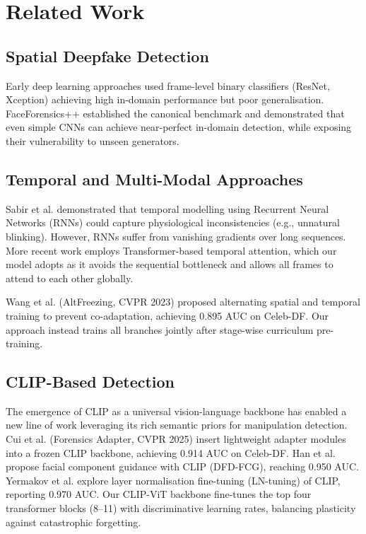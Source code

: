 \documentclass[journal]{IEEEtran}
\begin{document}
\section{Related Work}
\label{sec:related}

\subsection{Spatial Deepfake Detection}
Early deep learning approaches \cite{Li2018, Rossler2019} used frame-level binary classifiers (ResNet, Xception) achieving high in-domain performance but poor generalisation. FaceForensics++ \cite{Rossler2019} established the canonical benchmark and demonstrated that even simple CNNs can achieve near-perfect in-domain detection, while exposing their vulnerability to unseen generators.

\subsection{Temporal and Multi-Modal Approaches}
Sabir et al. \cite{Sabir2019} demonstrated that temporal modelling using Recurrent Neural Networks (RNNs) could capture physiological inconsistencies (e.g., unnatural blinking). However, RNNs suffer from vanishing gradients over long sequences. More recent work employs Transformer-based temporal attention, which our model adopts as it avoids the sequential bottleneck and allows all frames to attend to each other globally.

Wang et al. \cite{Wang2023} (AltFreezing, CVPR 2023) proposed alternating spatial and temporal training to prevent co-adaptation, achieving 0.895 AUC on Celeb-DF. Our approach instead trains all branches jointly after stage-wise curriculum pre-training.

\subsection{CLIP-Based Detection}
The emergence of CLIP \cite{Radford2021} as a universal vision-language backbone has enabled a new line of work leveraging its rich semantic priors for manipulation detection. Cui et al. \cite{Cui2025} (Forensics Adapter, CVPR 2025) insert lightweight adapter modules into a frozen CLIP backbone, achieving 0.914 AUC on Celeb-DF. Han et al. \cite{Han2025} propose facial component guidance with CLIP (DFD-FCG), reaching 0.950 AUC. Yermakov et al. \cite{Yermakov2025} explore layer normalisation fine-tuning (LN-tuning) of CLIP, reporting 0.970 AUC. Our CLIP-ViT backbone fine-tunes the top four transformer blocks (8--11) with discriminative learning rates, balancing plasticity against catastrophic forgetting.
\end{document}

